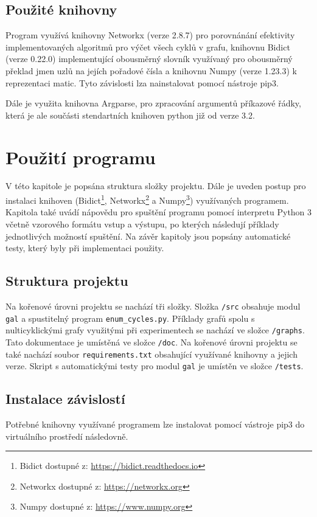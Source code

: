     \newpage

    \section{Použité knihovny}
        Program využívá knihovny Networkx (verze 2.8.7) pro porovnánání efektivity implementovaných algoritmů pro výčet všech cyklů v grafu, knihovnu Bidict (verze 0.22.0) implementující obousměrný slovník využívaný pro obousměrný překlad jmen uzlů na jejích pořadové čísla a knihovnu Numpy (verze 1.23.3) k reprezentaci matic. Tyto závislosti lza nainstalovat pomocí nástroje pip3.

        Dále je využita knihovna Argparse, pro zpracování argumentů příkazové řádky, která je ale součásti stendartních knihoven python již od verze 3.2.

\chapter{Použití programu}
    \label{chapter:Help}
    V této kapitole je popsána struktura složky projektu. Dále je uveden postup pro instalaci knihoven (Bidict\footnote{Bidict dostupné z: \url{https://bidict.readthedocs.io}}, Networkx\footnote{Networkx dostupné z: \url{https://networkx.org}} a Numpy\footnote{Numpy dostupné z: \url{https://www.numpy.org}}) využívaných programem. Kapitola také uvádí nápovědu pro spuštění programu pomocí interpretu Python 3 včetně vzorového formátu vstup a výstupu, po kterých následují příklady jednotlivých možností spuštění. Na závěr kapitoly jsou popsány automatické testy, který byly při implementaci použity.

    \section{Struktura projektu}
        Na kořenové úrovni projektu se nachází tři složky. Složka \texttt{/src} obsahuje modul \texttt{gal} a spustitelný program \texttt{enum\_cycles.py}. Příklady grafů spolu s nulticyklickými grafy využitými při experimentech se nachází ve složce \texttt{/graphs}. Tato dokumentace je umístěná ve složce \texttt{/doc}. Na kořenové úrovni projektu se také nachází soubor \texttt{requirements.txt} obsahující využívané knihovny a jejich verze. Skript s automatickými testy pro modul \texttt{gal} je umístěn ve složce \texttt{/tests}.

    \section{Instalace závislostí}
        Potřebné knihovny využívané programem lze instalovat pomocí vástroje pip3 do virtuálního prostředí následovně.

